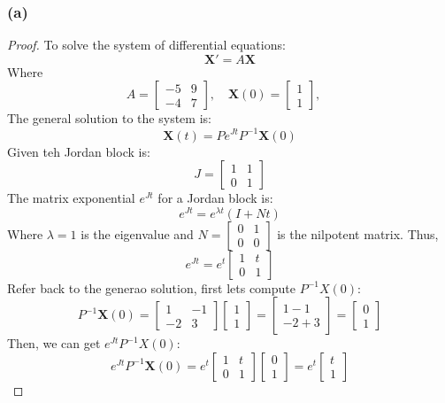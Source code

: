 \documentclass{article}
\begin{document}
\subsubsection*{(a)}
\begin{proof}
    To solve the system of differential equations:
    \[ \mathbf{X}' = A\mathbf{X} \]
    Where 
    \[ A = 
        \begin{bmatrix}
            -5 & 9 \\ -4 & 7
        \end{bmatrix},
        \quad
        \mathbf{X}(0) = 
        \begin{bmatrix}
            1 \\ 1
        \end{bmatrix},
        \quad
    \]
    The general solution to the system is:
    \[ \mathbf{X}(t) = Pe^{Jt}P^{-1}\mathbf{X}(0) \]
    Given teh Jordan block is:
    \[ J = \begin{bmatrix} 1 & 1 \\ 0 & 1 \end{bmatrix} \] 
    The matrix exponential $e^{Jt}$ for a Jordan block is:
    \[ e^{Jt} = e^{\lambda t}(I + Nt) \]
    Where $\lambda = 1$ is the eigenvalue and $N = \begin{bmatrix} 0 & 1 \\ 0 & 0 \end{bmatrix}$ is the nilpotent matrix. Thus,
    \[ e^{Jt} = e^t \begin{bmatrix} 1 & t \\ 0 & 1 \end{bmatrix} \]
    Refer back to the generao solution, first lets compute $P^{-1}X(0)$:
    \[ P^{-1}\mathbf{X}(0) = \begin{bmatrix} 1 & -1 \\ -2 & 3 \end{bmatrix} \begin{bmatrix} 1  \\ 1 \end{bmatrix} = \begin{bmatrix} 1 - 1 \\ -2 + 3 \end{bmatrix} = \begin{bmatrix} 0 \\ 1 \end{bmatrix} \]
    Then, we can get $e^{Jt}P^{-1}X(0)$:
    \[ e^{Jt}P^{-1}\mathbf{X}(0) = e^t \begin{bmatrix} 1 & t \\ 0 & 1 \end{bmatrix} \begin{bmatrix} 0 \\ 1 \end{bmatrix} = e^t \begin{bmatrix} t \\ 1 \end{bmatrix} \]

\end{proof}
\end{document}
